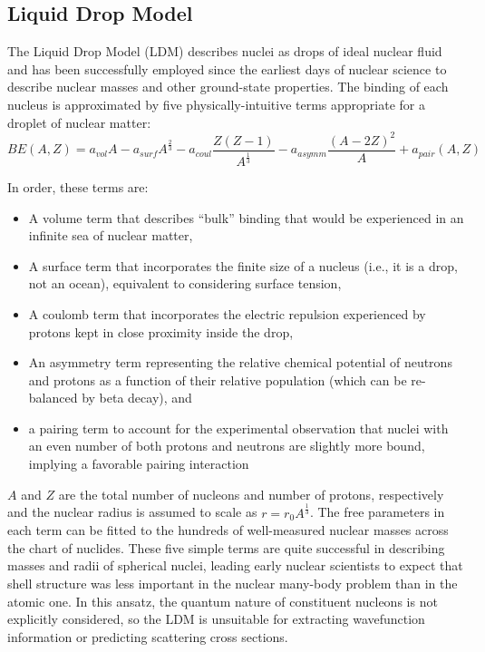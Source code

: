 \subsection{Liquid Drop Model}
The Liquid Drop Model (LDM) describes nuclei as drops of ideal nuclear fluid and
has been successfully employed since the earliest days of nuclear science to
describe nuclear masses and other ground-state properties. The binding of each
nucleus is approximated by five physically-intuitive terms appropriate for
a droplet of nuclear matter:
\begin{equation} \label{LDM}
    BE(A,Z) = a_{vol}A - a_{surf}A^{\frac{2}{3}}
    -a_{coul}\frac{Z(Z-1)}{A^{\frac{1}{3}}}-a_{asymm}\frac{(A-2Z)^{2}}{A}  +
        a_{pair}(A,Z)
\end{equation}

\noindent
In order, these terms are:
\begin{itemize}
    \item A volume term that describes ``bulk'' binding that would be experienced in an
        infinite sea of nuclear matter,
    \item A surface term that incorporates the finite size of a nucleus (i.e., it is a
        drop, not an ocean), equivalent to considering surface tension,
    \item A coulomb term that incorporates the electric repulsion experienced by protons
        kept in close proximity inside the drop,
    \item An asymmetry term representing the relative chemical potential of neutrons and
        protons as a function of their relative population (which can be re-balanced by
        beta decay), and
    \item a pairing term to account for the experimental observation that nuclei with an
        even number of both protons and neutrons are slightly more bound, implying a
        favorable pairing interaction
\end{itemize}
$A$ and $Z$ are the total number of nucleons and number of protons,
respectively and the nuclear radius is assumed to scale as $r = r_{0} A^{\frac{1}{3}}$.
The free parameters in each term can be fitted to the
hundreds of well-measured nuclear masses
across the chart of nuclides. These five simple terms are quite successful
in describing masses and radii of spherical nuclei, leading early nuclear
scientists to expect that shell structure was less important in the nuclear
many-body problem than in the atomic one. In this ansatz, the quantum
nature of constituent nucleons is not explicitly considered, so the LDM is  
unsuitable for extracting wavefunction information or predicting scattering
cross sections.


